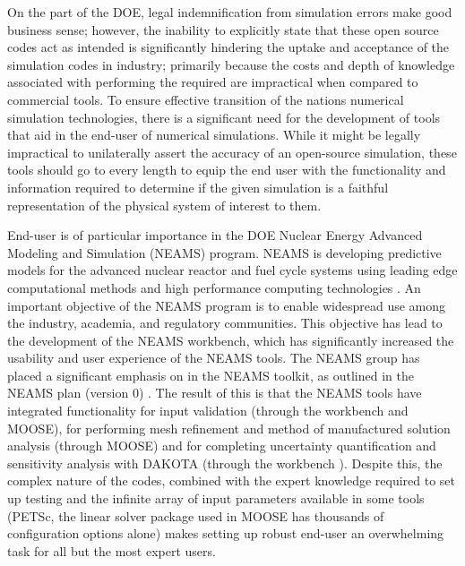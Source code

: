On the part of the DOE, legal indemnification from simulation errors make good business sense; however, the inability to explicitly state that these open source codes act as intended is significantly hindering the uptake and acceptance of the simulation codes in industry; primarily because the costs and depth of knowledge associated with performing the required \VV are impractical when compared to commercial tools. To ensure effective transition of the nations numerical simulation technologies, there is a significant need for the development of tools that aid in the end-user \VV of numerical simulations. While it might be legally impractical to unilaterally assert the accuracy of an open-source simulation, these tools should go to every length to equip the end user with the functionality and information required to determine if the given simulation is a faithful representation of the physical system of interest to them.   

End-user \VV is of particular importance in the DOE Nuclear Energy Advanced Modeling and Simulation (NEAMS) program. NEAMS is developing predictive models for the advanced nuclear reactor and fuel cycle systems using leading edge computational methods and high performance computing technologies \cite{NEAMS}. An important objective of the NEAMS program is to enable widespread use among the industry, academia, and regulatory communities\cite{NEAMS}. This objective has lead to the 
development of the NEAMS workbench, which has significantly increased the usability and user experience of the NEAMS tools. The NEAMS group has placed a significant emphasis on \VV in the NEAMS toolkit, as outlined in the NEAMS \VV plan (version 0) \cite{}. The result of this is that the NEAMS tools have integrated functionality for input validation (through the workbench and MOOSE), for performing mesh refinement and method of manufactured solution analysis (through MOOSE) and for completing uncertainty quantification and sensitivity analysis with DAKOTA (through the workbench \cite{}). Despite this, the complex nature of the codes, combined with the expert knowledge required to set up \VV testing and the infinite array of input parameters available in some tools (PETSc, the linear solver package used in MOOSE has thousands of configuration options alone) makes setting up robust end-user \VV an overwhelming task for all but the most expert users.   

